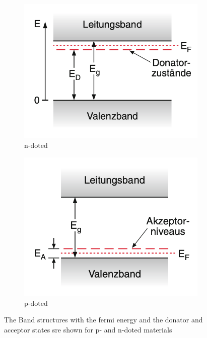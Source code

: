 \begin{figure}
    \centering
    \begin{subfigure}{0.49\textwidth}
        \includegraphics[width = \textwidth]{bilder/n_Donatorschema_demtroeder.png}
        \caption{n-doted}
    \end{subfigure}
    \hfill
    \begin{subfigure}{0.49\textwidth}
        \includegraphics[width = \textwidth]{bilder/p_Donatorschema_demtroeder.png}
        \caption{p-doted}
    \end{subfigure}
    \caption{The Band structures with the fermi energy and the donator and acceptor states sre shown for p- and n-doted materials \cite{demtroeder}}
    \label{fig:doting}
\end{figure}


